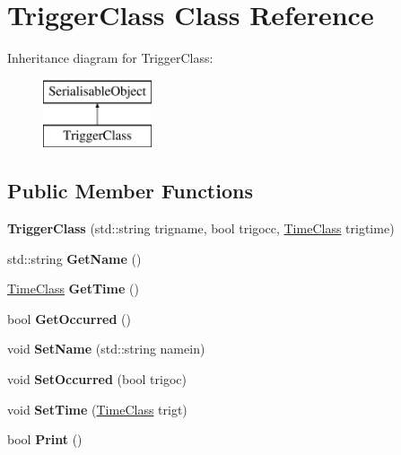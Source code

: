 \hypertarget{classTriggerClass}{\section{Trigger\-Class Class Reference}
\label{classTriggerClass}
}
Inheritance diagram for Trigger\-Class\-:\begin{figure}[H]
\begin{center}
\leavevmode
\includegraphics[height=2.000000cm]{classTriggerClass}
\end{center}
\end{figure}
\subsection*{Public Member Functions}
\begin{DoxyCompactItemize}
\item 
\hypertarget{classTriggerClass_a9f357ce4ca5ef8ec90d8266812254c80}{{\bfseries Trigger\-Class} (std\-::string trigname, bool trigocc, \hyperlink{classTimeClass}{Time\-Class} trigtime)}\label{classTriggerClass_a9f357ce4ca5ef8ec90d8266812254c80}

\item 
\hypertarget{classTriggerClass_a1e61f6eb6f17e9adfe4c2c3c2a716cf4}{std\-::string {\bfseries Get\-Name} ()}\label{classTriggerClass_a1e61f6eb6f17e9adfe4c2c3c2a716cf4}

\item 
\hypertarget{classTriggerClass_aeac33b25957d156fc4c61afd97738732}{\hyperlink{classTimeClass}{Time\-Class} {\bfseries Get\-Time} ()}\label{classTriggerClass_aeac33b25957d156fc4c61afd97738732}

\item 
\hypertarget{classTriggerClass_a02db7d69bdb11b2f4c6f3c1cbd55eebe}{bool {\bfseries Get\-Occurred} ()}\label{classTriggerClass_a02db7d69bdb11b2f4c6f3c1cbd55eebe}

\item 
\hypertarget{classTriggerClass_a57f22d137aefc8e9582c995c3f7ccf02}{void {\bfseries Set\-Name} (std\-::string namein)}\label{classTriggerClass_a57f22d137aefc8e9582c995c3f7ccf02}

\item 
\hypertarget{classTriggerClass_ae63e127367c5fde471fe91edad3aa8f3}{void {\bfseries Set\-Occurred} (bool trigoc)}\label{classTriggerClass_ae63e127367c5fde471fe91edad3aa8f3}

\item 
\hypertarget{classTriggerClass_a19124a1a8bbae6ca485878422c827cdf}{void {\bfseries Set\-Time} (\hyperlink{classTimeClass}{Time\-Class} trigt)}\label{classTriggerClass_a19124a1a8bbae6ca485878422c827cdf}

\item 
\hypertarget{classTriggerClass_ad1938d5ca4ae67263fde1b678a36623a}{bool {\bfseries Print} ()}\label{classTriggerClass_ad1938d5ca4ae67263fde1b678a36623a}

\end{DoxyCompactItemize}
